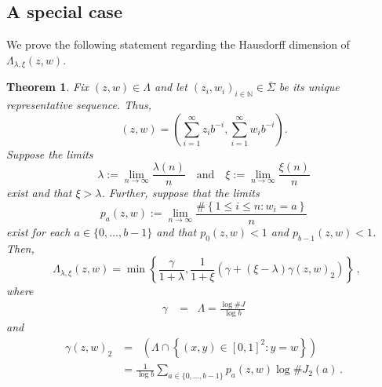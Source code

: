 \documentclass[12pt]{article}
\newtheorem{theorem}[definition]{Theorem}
\theoremstyle{remark}
\numberwithin{equation}{section}
\renewcommand{\Bbb}[1]{\mathbb{#1}}
\newcommand{\N}{{\Bbb N}}         %
\newcommand{\0}{\mathbf{0}}
\DeclareMathOperator{\dimh}{\dim_H}
\begin{document}
\subsection{A special case}
 We prove the following statement regarding the Hausdorff dimension of $\Lambda_{\lambda,\xi}(z,w)$.

\begin{theorem} \label{corollary}
Fix $(z,w) \in \Lambda$ and let $(z_{i},w_{i})_{i \in \N} \in \bar{\Sigma}$ be its unique representative sequence. Thus,
\begin{equation*}
(z,w)=\left( \sum_{i=1}^{\infty} z_{i}b^{-i} , \sum_{i=1}^{\infty} w_{i} b^{-i} \right).
\end{equation*} 
Suppose the limits 
\[\lambda:=\lim_{n \to \infty} \frac{\lambda(n)}{n} \quad \text{and} \quad \xi:=\lim_{n \to \infty} \frac{\xi(n)}{n}\] 
exist and that $\xi>\lambda$. Further, suppose that the limits
\begin{equation*}
    p_{a}(z,w):=\lim_{n \to \infty}\frac{\#\left\{1 \leq i \leq n : w_{i}=a \right\}}{n}
\end{equation*}
exist for each $a \in \{0, \dots, b-1\}$ and that $p_{0}(z,w)<1$ and $p_{b-1}(z,w)<1$. Then,
\begin{equation*}
    \dimh \Lambda_{\lambda,\xi}(z,w) = \min\left\{ \frac{\gamma}{1+\lambda}, \frac{1}{1+\xi}\left(\gamma + (\xi-\lambda)\gamma(z,w)_{2} \right) \right\}\, ,
\end{equation*}
where
\begin{align*}
    \gamma &=\dimh \Lambda = \frac{\log\#J}{\log b} 
\end{align*}
and
\begin{align*}
    \gamma(z,w)_{2} &=\dimh \left(\Lambda \cap \left\{(x,y) \in [0,1]^{2} : y=w\right\}\right) \\
                    &=\frac{1}{\log b} \sum_{a \in \{0, \dots , b-1\}} p_{a}(z,w) \log \#J_{2}(a)\,.
\end{align*}
\end{theorem}
\end{document}
